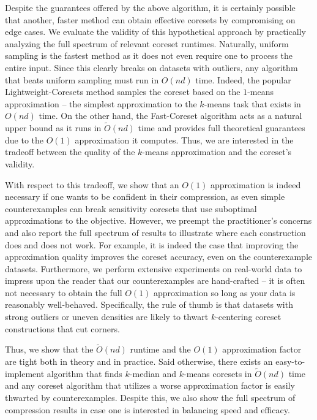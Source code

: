 Despite the guarantees offered by the above algorithm, it is certainly possible that another, faster method can obtain effective coresets by compromising on
edge cases. We evaluate the validity of this hypothetical approach by practically analyzing the full spectrum of relevant coreset runtimes.  Naturally, uniform
sampling is the fastest method as it does not even require one to process the entire input. Since this clearly breaks on datasets with outliers, any algorithm
that beats  uniform sampling must run in $O(nd)$ time. Indeed, the popular Lightweight-Coresets method samples the coreset based on the $1$-means approximation
-- the simplest approximation to the $k$-means task that exists in $O(nd)$ time. On the other hand, the Fast-Coreset algorithm acts as a natural upper bound as
it runs in $\tilde{O}(nd)$ time and provides full theoretical guarantees due to the $O(1)$ approximation  it computes. Thus, we are interested in the tradeoff
between the quality of the $k$-means approximation and the coreset's validity.

With respect to this tradeoff, we show that an $O(1)$ approximation is indeed necessary if one wants to be confident in their compression, as even simple
counterexamples can break sensitivity coresets that use suboptimal approximations to the objective. However, we preempt the practitioner's concerns and also report
the full spectrum of results to illustrate where each construction does and does not work. For example, it is indeed the case that improving the approximation
quality improves the coreset accuracy, even on the counterexample datasets. Furthermore, we perform extensive experiments on real-world data to impress upon the
reader that our counterexamples are hand-crafted -- it is often not necessary to obtain the full $O(1)$ approximation so long as your data is reasonably
well-behaved. Specifically, the rule of thumb is that datasets with strong outliers or uneven densities are likely to thwart $k$-centering coreset
constructions that cut corners.

Thus, we show that the $\tilde{O}(nd)$ runtime and the $O(1)$ approximation factor are tight both in theory and in practice.
Said otherwise, there exists an easy-to-implement algorithm that finds $k$-median and $k$-means coresets in $\tilde{O}(nd)$ time and any coreset
algorithm that utilizes a worse approximation factor is easily thwarted by counterexamples. Despite this, we also show the full spectrum of compression results
in case one is interested in balancing speed and efficacy.

